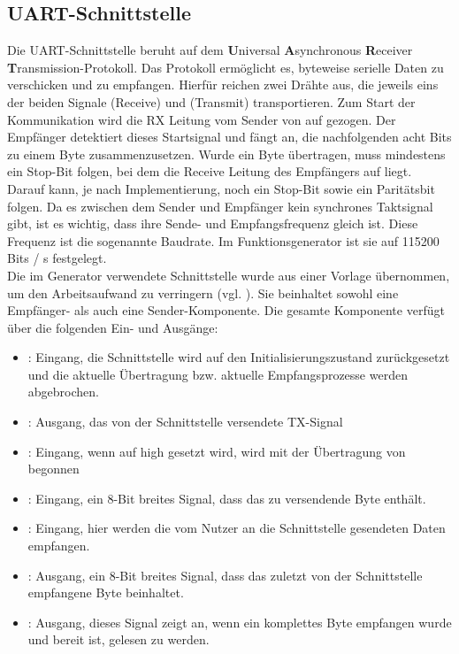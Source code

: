 \subsection{UART-Schnittstelle}
Die UART-Schnittstelle beruht auf dem \textbf{U}niversal \textbf{A}synchronous \textbf{R}eceiver \textbf{T}ransmission-Protokoll.
Das Protokoll ermöglicht es, byteweise serielle Daten zu verschicken und zu empfangen.
Hierfür reichen zwei Drähte aus, die jeweils eins der beiden Signale  (Receive) und  (Transmit) transportieren.
Zum Start der Kommunikation wird die RX Leitung vom Sender von  auf  gezogen.
Der Empfänger detektiert dieses Startsignal und fängt an, die nachfolgenden acht Bits zu einem Byte zusammenzusetzen.
Wurde ein Byte übertragen, muss mindestens ein Stop-Bit folgen, bei dem die Receive Leitung des Empfängers auf  liegt.
Darauf kann, je nach Implementierung, noch ein Stop-Bit sowie ein Paritätsbit folgen.
Da es zwischen dem Sender und Empfänger kein synchrones Taktsignal gibt, ist es wichtig, dass ihre Sende- und Empfangsfrequenz gleich ist.
Diese Frequenz ist die sogenannte Baudrate.
Im Funktionsgenerator ist sie auf 115200 Bits / s festgelegt. \\
Die im Generator verwendete Schnittstelle wurde aus einer Vorlage übernommen, um den Arbeitsaufwand zu verringern (vgl. \cite{digilent2020}).
Sie beinhaltet sowohl eine Empfänger- als auch eine Sender-Komponente.
Die gesamte Komponente verfügt über die folgenden Ein- und Ausgänge:
\begin{itemize}
\item {}: Eingang, die Schnittstelle wird auf den Initialisierungszustand zurückgesetzt und die aktuelle Übertragung bzw. aktuelle Empfangsprozesse werden abgebrochen.

\item {}: Ausgang, das von der Schnittstelle versendete TX-Signal 
  \item {}: Eingang, wenn  auf high gesetzt wird, wird mit der Übertragung von  begonnen
\item {}: Eingang, ein 8-Bit breites Signal, dass das zu versendende Byte enthält.

\item {}: Eingang, hier werden die vom Nutzer an die Schnittstelle gesendeten Daten empfangen.
\item {}: Ausgang, ein 8-Bit breites Signal, dass das zuletzt von der Schnittstelle empfangene Byte beinhaltet.
\item {}: Ausgang, dieses Signal zeigt an, wenn ein komplettes Byte empfangen wurde und bereit ist, gelesen zu werden.
\end{itemize}
  
